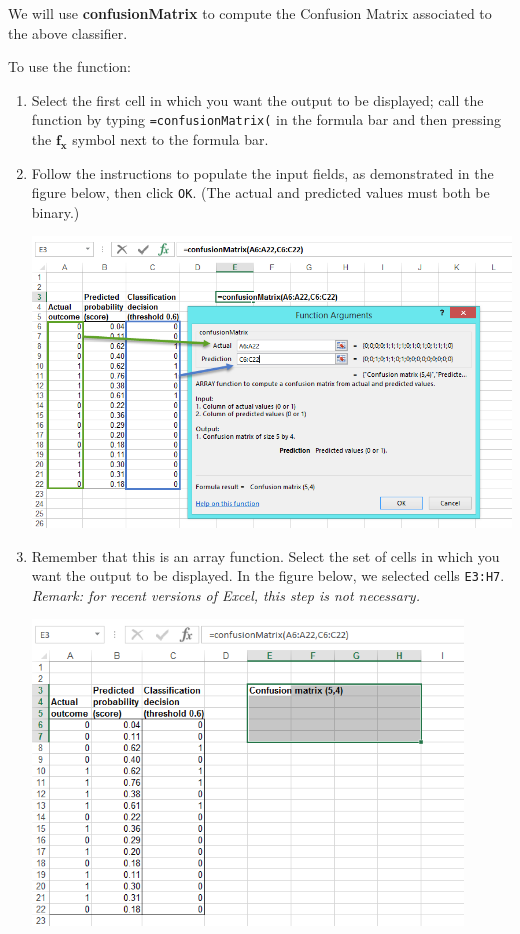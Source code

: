 \documentclass[12pt]{article}
\begin{document}
\medskip
We will use \textbf{confusionMatrix} to compute the Confusion Matrix associated to the above classifier.

To use the function:
\begin{enumerate}

\item Select the first cell in which you want the output to be displayed; call the function by typing \texttt{=confusionMatrix(} in the formula bar and then pressing the $\boldsymbol{f_x}$ symbol next to the formula bar.

\item Follow the instructions to populate the input fields, as demonstrated in the figure below, then click \texttt{OK}. (The actual and predicted values must both be binary.)

\medskip

\centerline{\includegraphics[width=5.5in]{figures/conf3.png}}

\medskip

\item Remember that this is an array function. Select the set of cells in which you want the output to be displayed. In the figure below, we selected cells \texttt{E3:H7}. \textit{Remark: for recent versions of Excel, this step is not necessary.}

\medskip

\centerline{\includegraphics[width=4.5in]{figures/conf4.png}}


\end{enumerate}
\end{document}
